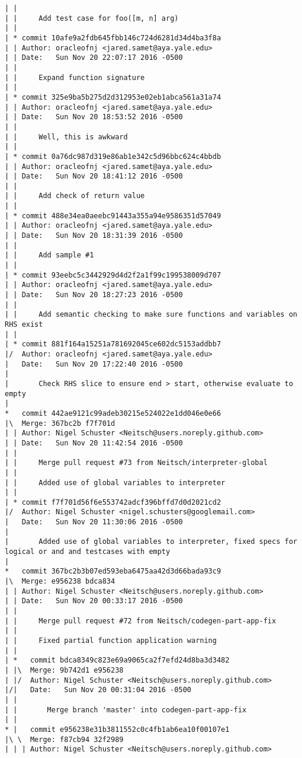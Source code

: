 \begin{lstlisting}
| | 
| |     Add test case for foo([m, n] arg)
| |   
| * commit 10afe9a2fdb645fbb146c724d6281d34d4ba3f8a
| | Author: oracleofnj <jared.samet@aya.yale.edu>
| | Date:   Sun Nov 20 22:07:17 2016 -0500
| | 
| |     Expand function signature
| |   
| * commit 325e9ba5b275d2d312953e02eb1abca561a31a74
| | Author: oracleofnj <jared.samet@aya.yale.edu>
| | Date:   Sun Nov 20 18:53:52 2016 -0500
| | 
| |     Well, this is awkward
| |   
| * commit 0a76dc987d319e86ab1e342c5d96bbc624c4bbdb
| | Author: oracleofnj <jared.samet@aya.yale.edu>
| | Date:   Sun Nov 20 18:41:12 2016 -0500
| | 
| |     Add check of return value
| |   
| * commit 488e34ea0aeebc91443a355a94e9586351d57049
| | Author: oracleofnj <jared.samet@aya.yale.edu>
| | Date:   Sun Nov 20 18:31:39 2016 -0500
| | 
| |     Add sample #1
| |   
| * commit 93eebc5c3442929d4d2f2a1f99c199538009d707
| | Author: oracleofnj <jared.samet@aya.yale.edu>
| | Date:   Sun Nov 20 18:27:23 2016 -0500
| | 
| |     Add semantic checking to make sure functions and variables on RHS exist
| |   
| * commit 881f164a15251a781692045ce602dc5153addbb7
|/  Author: oracleofnj <jared.samet@aya.yale.edu>
|   Date:   Sun Nov 20 17:22:40 2016 -0500
|   
|       Check RHS slice to ensure end > start, otherwise evaluate to empty
|    
*   commit 442ae9121c99adeb30215e524022e1dd046e0e66
|\  Merge: 367bc2b f7f701d
| | Author: Nigel Schuster <Neitsch@users.noreply.github.com>
| | Date:   Sun Nov 20 11:42:54 2016 -0500
| | 
| |     Merge pull request #73 from Neitsch/interpreter-global
| |     
| |     Added use of global variables to interpreter
| |   
| * commit f7f701d56f6e553742adcf396bffd7d0d2021cd2
|/  Author: Nigel Schuster <nigel.schusters@googlemail.com>
|   Date:   Sun Nov 20 11:30:06 2016 -0500
|   
|       Added use of global variables to interpreter, fixed specs for logical or and and testcases with empty
|    
*   commit 367bc2b3b07ed593eba6475aa42d3d66bada93c9
|\  Merge: e956238 bdca834
| | Author: Nigel Schuster <Neitsch@users.noreply.github.com>
| | Date:   Sun Nov 20 00:33:17 2016 -0500
| | 
| |     Merge pull request #72 from Neitsch/codegen-part-app-fix
| |     
| |     Fixed partial function application warning
| |     
| *   commit bdca8349c823e69a9065ca2f7efd24d8ba3d3482
| |\  Merge: 9b742d1 e956238
| |/  Author: Nigel Schuster <Neitsch@users.noreply.github.com>
|/|   Date:   Sun Nov 20 00:31:04 2016 -0500
| |   
| |       Merge branch 'master' into codegen-part-app-fix
| |     
* |   commit e956238e31b3811552c0c4fb1ab6ea10f00107e1
|\ \  Merge: f87cb94 32f2989
| | | Author: Nigel Schuster <Neitsch@users.noreply.github.com>

\end{lstlisting}

